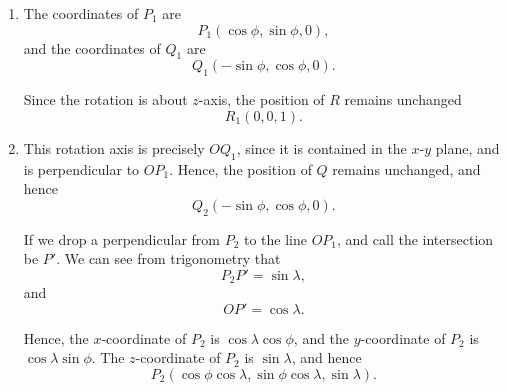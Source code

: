 \Question{\currfilebase}

\begin{enumerate}
    \item The coordinates of \(P_1\) are
          \[
              P_1 (\cos \phi, \sin \phi, 0),
          \]
          and the coordinates of \(Q_1\) are
          \[
              Q_1 (- \sin \phi, \cos \phi, 0).
          \]

          Since the rotation is about \(z\)-axis, the position of \(R\) remains unchanged
          \[
              R_1 (0, 0, 1).
          \]

    \item This rotation axis is precisely \(OQ_1\), since it is contained in the \(x\)-\(y\) plane, and is perpendicular to \(OP_1\). Hence, the position of \(Q\) remains unchanged, and hence
          \[
              Q_2 (- \sin \phi, \cos \phi, 0).
          \]

          If we drop a perpendicular from \(P_2\) to the line \(OP_1\), and call the intersection be \(P'\). We can see from trigonometry that
          \[
              P_2 P' = \sin \lambda,
          \]
          and
          \[
              O P' = \cos \lambda.
          \]

          Hence, the \(x\)-coordinate of \(P_2\) is \(\cos \lambda \cos \phi\), and the \(y\)-coordinate of \(P_2\) is \(\cos \lambda \sin \phi\). The \(z\)-coordinate of \(P_2\) is \(\sin \lambda\), and hence
          \[
              P_2 (\cos \phi \cos \lambda, \sin \phi \cos \lambda, \sin \lambda).
          \]


\end{enumerate}
